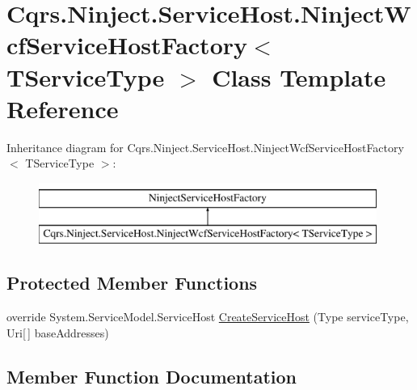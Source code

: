 \hypertarget{classCqrs_1_1Ninject_1_1ServiceHost_1_1NinjectWcfServiceHostFactory}{}\section{Cqrs.\+Ninject.\+Service\+Host.\+Ninject\+Wcf\+Service\+Host\+Factory$<$ T\+Service\+Type $>$ Class Template Reference}
\label{classCqrs_1_1Ninject_1_1ServiceHost_1_1NinjectWcfServiceHostFactory}
Inheritance diagram for Cqrs.\+Ninject.\+Service\+Host.\+Ninject\+Wcf\+Service\+Host\+Factory$<$ T\+Service\+Type $>$\+:\begin{figure}[H]
\begin{center}
\leavevmode
\includegraphics[height=2.000000cm]{classCqrs_1_1Ninject_1_1ServiceHost_1_1NinjectWcfServiceHostFactory}
\end{center}
\end{figure}
\subsection*{Protected Member Functions}
\begin{DoxyCompactItemize}
\item 
override System.\+Service\+Model.\+Service\+Host \hyperlink{classCqrs_1_1Ninject_1_1ServiceHost_1_1NinjectWcfServiceHostFactory_aea8f1d5ab6287ef4abf7145d5467cdd5}{Create\+Service\+Host} (Type service\+Type, Uri\mbox{[}$\,$\mbox{]} base\+Addresses)
\end{DoxyCompactItemize}


\subsection{Member Function Documentation}
\mbox{\label{classCqrs_1_1Ninject_1_1ServiceHost_1_1NinjectWcfServiceHostFactory_aea8f1d5ab6287ef4abf7145d5467cdd5}} 
